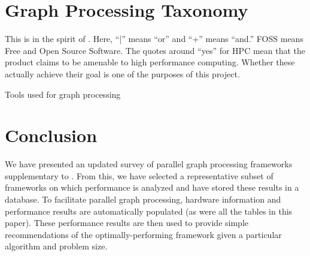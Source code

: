 \documentclass[conference]{IEEEtran}
\begin{document}
\section{Graph Processing Taxonomy}
This is in the spirit of \cite{Doekemeijer:2015:GPFSurvey}. Here, ``|'' means ``or'' and ``+'' means ``and.'' FOSS means Free and Open Source Software. The quotes around ``yes'' for HPC mean that the product claims to be amenable to high performance computing. Whether these actually achieve their goal is one of the purposes of this project.
\begin{table*}[t]
	\begin{minipage}{\linewidth} %
		\centering
		\caption{Tools used for graph processing}
		\label{tab:frameworks}
	\end{minipage}
\end{table*}


\section{Conclusion} %
We have presented an updated survey of parallel graph processing frameworks supplementary to \cite{Doekemeijer:2015:GPFSurvey}. From this, we have selected a representative subset of frameworks on which performance is analyzed and have stored these results in a database. To facilitate parallel graph processing, hardware information and performance results are automatically populated (as were all the tables in this paper). These performance results are then used to provide simple recommendations of the optimally-performing framework given a particular algorithm and problem size.

%


\end{document}
